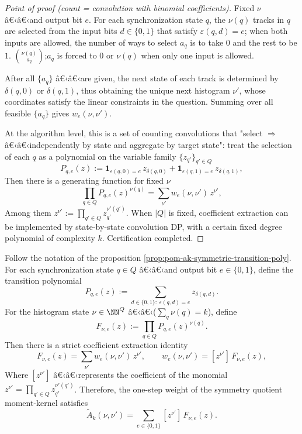 \begin{proof}[Point of proof (count = convolution with binomial coefficients)]
Fixed $\nu$ â€‹â€‹and output bit $e$. For each synchronization state $q$, the $\nu(q)$ tracks in $q$ are selected from the input bits $d\in\{0,1\}$ that satisfy $\varepsilon(q,d)=e$; when both inputs are allowed, the number of ways to select $a_q$ is to take $0$ and the rest to be $1$. $\binom{\nu(q)}{a_q}$;$a_q$ is forced to $0$ or $\nu(q)$ when only one input is allowed.

After all $\{a_q\}$ â€‹â€‹are given, the next state of each track is determined by $\delta(q,0)$ or $\delta(q,1)$, thus obtaining the unique next histogram $\nu'$, whose coordinates satisfy the linear constraints in the question. Summing over all feasible $\{a_q\}$ gives $w_e(\nu,\nu')$.

At the algorithm level, this is a set of counting convolutions that "select $\Rightarrow$ â€‹â€‹independently by state and aggregate by target state": treat the selection of each $q$ as a polynomial on the variable family $\{z_{q'}\}_{q'\in Q}$
$$
P_{q,e}(z):=\mathbf{1}_{\varepsilon(q,0)=e}\,z_{\delta(q,0)}+\mathbf{1}_{\varepsilon(q,1)=e}\,z_{\delta(q,1)},
$$
Then there is a generating function for fixed $\nu$
$$
\prod_{q\in Q} P_{q,e}(z)^{\nu(q)}
=\sum_{\nu'} w_e(\nu,\nu')\,z^{\nu'},
$$
Among them $z^{\nu'}:=\prod_{q'\in Q} z_{q'}^{\nu'(q')}$. When $|Q|$ is fixed, coefficient extraction can be implemented by state-by-state convolution DP, with a certain fixed degree polynomial of complexity $k$. Certification completed.
\end{proof}

\begin{corollary}\label{cor:pom-ak-coefficient-extraction}
Follow the notation of the proposition \ref{prop:pom-ak-symmetric-transition-poly}.
For each synchronization state \(q\in Q\) â€‹â€‹and output bit \(e\in\{0,1\}\), define the transition polynomial
\[
P_{q,e}(z):=\sum_{d\in\{0,1\}:\ \varepsilon(q,d)=e} z_{\delta(q,d)}.
\]
For the histogram state \(\nu\in\NN^Q\) â€‹â€‹(\(\sum_q\nu(q)=k\)), define
\[
F_{\nu,e}(z):=\prod_{q\in Q}P_{q,e}(z)^{\nu(q)}.
\]
Then there is a strict coefficient extraction identity
\[
F_{\nu,e}(z)=\sum_{\nu'} w_e(\nu,\nu')\,z^{\nu'},
\qquad
w_e(\nu,\nu')=[z^{\nu'}]\,F_{\nu,e}(z),
\]
Where \([z^{\nu'}]\) â€‹â€‹represents the coefficient of the monomial \(z^{\nu'}=\prod_{q'\in Q} z_{q'}^{\nu'(q')}\).
Therefore, the one-step weight of the symmetry quotient moment-kernel satisfies
\[
\widetilde A_k(\nu,\nu')=\sum_{e\in\{0,1\}}[z^{\nu'}]\,F_{\nu,e}(z).
\]
\end{corollary}

